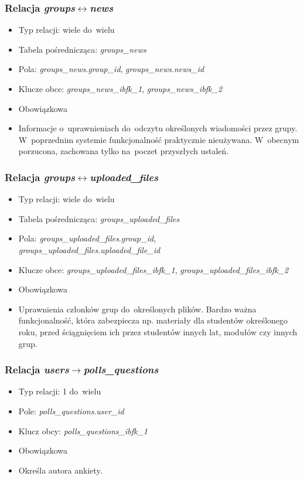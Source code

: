 \documentclass[a4paper,12pt,oneside]{report}
\begin{document}
\subsubsection{Relacja \emph{groups}$\leftrightarrow$\emph{news}}
\label{subsub:groups-news}
\begin{itemize}
  \item Typ relacji: wiele do~wielu
  \item Tabela pośrednicząca: \emph{groups\_news}
  \item Pola: \emph{groups\_news}.\emph{group\_id}, \emph{groups\_news}.\emph{news\_id}
  \item Klucze obce: \emph{groups\_news\_ibfk\_1}, \emph{groups\_news\_ibfk\_2}
  \item Obowiązkowa
  \item Informacje o~uprawnieniach do~odczytu określonych wiadomości przez grupy. W~poprzednim systemie funkcjonalność praktycznie nieużywana. W~obecnym porzucona, zachowana tylko na~poczet przyszłych ustaleń.
\end{itemize}

\subsubsection{Relacja \emph{groups}$\leftrightarrow$\emph{uploaded\_files}}
\label{subsub:groups-uploaded_files}
\begin{itemize}
  \item Typ relacji: wiele do~wielu
  \item Tabela pośrednicząca: \emph{groups\_uploaded\_files}
  \item Pola: \emph{groups\_uploaded\_files}.\emph{group\_id}, \emph{groups\_uploaded\_files}.\emph{uploaded\_file\_id}
  \item Klucze obce: \emph{groups\_uploaded\_files\_ibfk\_1}, \emph{groups\_uploaded\_files\_ibfk\_2}
  \item Obowiązkowa
  \item Uprawnienia członków grup do~określonych plików. Bardzo ważna funkcjonalność, która zabezpiecza np. materiały dla studentów określonego roku, przed ściągnięciem ich przez studentów innych lat, modułów czy innych grup.
\end{itemize}

\subsubsection{Relacja \emph{users}$\to$\emph{polls\_questions}}
\label{subsub:users-polls_questions}
\begin{itemize}
  \item Typ relacji: 1 do~wielu
  \item Pole: \emph{polls\_questions}.\emph{user\_id}
  \item Klucz obcy: \emph{polls\_questions\_ibfk\_1}
  \item Obowiązkowa
  \item Określa autora ankiety.
\end{itemize}
\end{document}

